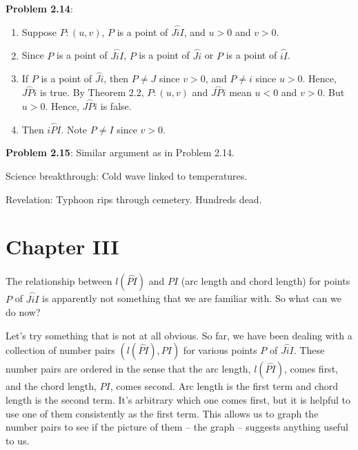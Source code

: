 \documentclass[english]{book}
\newcommand{\arc}[1]{\overset{\frown}{#1} }
\begin{document}
\textbf{Problem 2.14}:
\begin{enumerate}[\hspace{1cm}a)]
  \item Suppose $P:(u,v)$, $P$ is a point of $\arc{JiI}$, and $u>0$ and $v>0$.
  \item Since $P$ is a point of $\arc{JiI}$, $P$ is a point of $\arc{Ji}$ or $P$ is a point of $\arc{iI}$.
  \item If $P$ is a point of $\arc{Ji}$, then $P \neq J$ since $v>0$, and $P \neq i$ since $u>0$. Hence, $\arc{JPi}$ is true. By Theorem 2.2, $P:(u,v)$ and $\arc{JPi}$ mean $u<0$ and $v>0$. But $u>0$. Hence, $\arc{JPi}$ is false.
  \item Then $\arc{iPI}$. Note $P \neq I$ since $v>0$.
\end{enumerate}

\textbf{Problem 2.15}: Similar argument as in Problem 2.14.

\vspace{0.3cm}

\vspace{2cm}

\begin{center}
Science breakthrough: Cold wave linked to temperatures.
\vspace{0.5cm}

Revelation: Typhoon rips through cemetery. Hundreds dead.
\end{center}



\chapter*{Chapter III}


The relationship between $l(\arc{PI})$ and $PI$ (arc length and chord length) for points $P$ of $\arc{JiI}$ is apparently not something that we are familiar with. So what can we do now?

Let's try something that is not at all obvious. So far, we have been dealing with a collection of number pairs $(l(\arc{PI}), PI)$ for various points $P$ of $\arc{JiI}$. These number pairs are ordered in the sense that the arc length, $l(\arc{PI})$, comes first, and the chord length, $PI$, comes second. Arc length is the first term and chord length is the second term. It's arbitrary which one comes first, but it is helpful to use one of them consistently as the first term. This allows us to graph the number pairs to see if the picture of them -- the graph -- suggests anything useful to us. 
\end{document}
